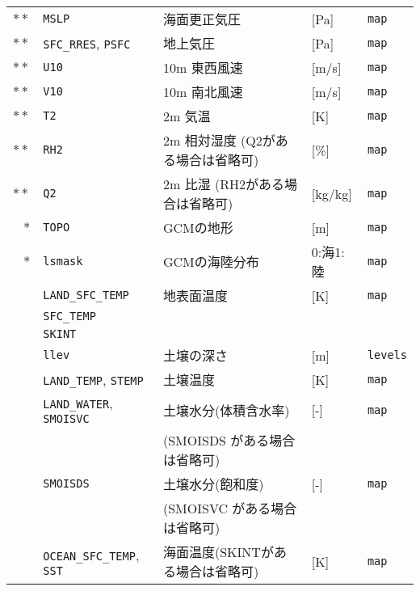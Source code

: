 {\begin{table}[!h]
\begin{center}
\begin{tabularx}{150mm}{rl|l|l|X}
$\ast\ast$ &\verb|MSLP|    & 海面更正気圧                      & [Pa]     & \verb|map| \\
$\ast\ast$ &\verb|SFC_RRES|, \verb|PSFC|    & 地上気圧                          & [Pa]     & \verb|map| \\
$\ast\ast$ &\verb|U10|     & 10m 東西風速                      & [m/s]    & \verb|map| \\
$\ast\ast$ &\verb|V10|     & 10m 南北風速                      & [m/s]    & \verb|map| \\
$\ast\ast$ &\verb|T2|      & 2m 気温                           & [K]      & \verb|map| \\
$\ast\ast$ &\verb|RH2|     & 2m 相対湿度 (Q2がある場合は省略可) & [\%]    & \verb|map| \\
$\ast\ast$ &\verb|Q2|      & 2m 比湿 (RH2がある場合は省略可)    & [kg/kg] & \verb|map| \\
    $\ast$ &\verb|TOPO|    & GCMの地形                         & [m]      & \verb|map| \\
    $\ast$ &\verb|lsmask|  & GCMの海陸分布                     & 0:海1:陸 & \verb|map| \\
           &\verb|LAND_SFC_TEMP| & 地表面温度                  & [K]      & \verb|map| \\
           &\verb|SFC_TEMP|&                                   &          &   \\
           &\verb|SKINT|   &                                   &          &   \\
           &\verb|llev|    & 土壌の深さ                        & [m]      & \verb|levels| \\
           &\verb|LAND_TEMP|, \verb|STEMP|   & 土壌温度                          & [K]      & \verb|map| \\
           &\verb|LAND_WATER|, \verb|SMOISVC| & 土壌水分(体積含水率)              & [-]      & \verb|map| \\
           &               & (SMOISDS がある場合は省略可)      &          &            \\
           &\verb|SMOISDS| & 土壌水分(飽和度)                  & [-]      & \verb|map| \\
           &               & (SMOISVC がある場合は省略可)      &          &            \\
           &\verb|OCEAN_SFC_TEMP|, \verb|SST|     & 海面温度(SKINTがある場合は省略可) & [K]      & \verb|map| \\ \hline
\end{tabularx}
\end{center}
\end{table}
}
